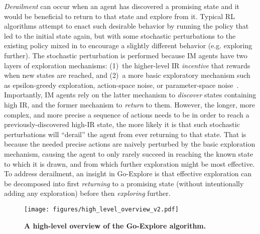 \documentclass{article}
\begin{document}
\emph{Derailment} can occur when an agent has discovered a promising state and it would be beneficial to return to that state and explore from it. Typical RL algorithms attempt to enact such desirable behavior by running the policy that led to the initial state again, but with some stochastic perturbations to the existing policy mixed in to encourage a slightly different behavior (e.g. exploring further). 
The stochastic perturbation is performed because IM agents have two layers of exploration mechanisms: (1)~the higher-level IR \emph{incentive} that rewards when new states are reached, and (2)~a more basic exploratory mechanism such as epsilon-greedy exploration, action-space noise, or parameter-space noise~\cite{sutton1998reinforcement,plappert2017parameter,Rckstie2008StateDependentEF}. Importantly, IM agents rely on the latter mechanism to \emph{discover} states containing high IR, and the former mechanism to \emph{return} to them. However, the longer, more complex, and more precise a sequence of actions needs to be in order to reach a previously-discovered high-IR state, the more likely it is that such stochastic perturbations will ``derail'' the agent from ever returning to that state. That is because the needed precise actions are naively perturbed by the basic exploration mechanism, causing the agent to only rarely succeed in reaching the known state to which it is drawn, and from which further exploration might be most effective. To address derailment, an insight in Go-Explore is that effective exploration can be decomposed into first \emph{returning} to a promising state (without intentionally adding any exploration) before then \emph{exploring} further.

\begin{figure}[t]
    \centering
    \texttt{[image: figures/high\_level\_overview\_v2.pdf]}
    \caption{\textbf{A high-level overview of the Go-Explore algorithm.}}
    \label{fig:goexp_overview}
\end{figure}
\end{document}
